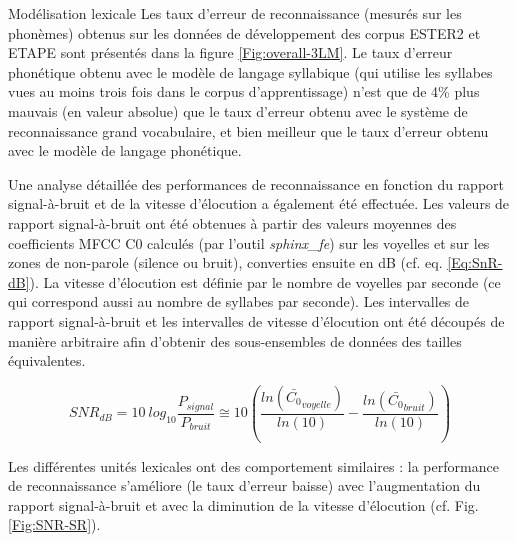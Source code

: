 \documentclass{style/these}
\begin{document}
\begin{part}{Modélisation lexicale}
Les taux d'erreur de reconnaissance (mesurés sur les phonèmes) obtenus sur les données de développement des corpus ESTER2 et ETAPE sont présentés dans la figure \ref{Fig:overall-3LM}. 
Le taux d'erreur phonétique obtenu avec le modèle de langage syllabique (qui utilise les syllabes vues au moins trois fois dans le corpus d'apprentissage) n'est que de 4\% plus mauvais (en valeur absolue) que le taux d'erreur obtenu avec le système de reconnaissance grand vocabulaire, et bien meilleur que le taux d'erreur obtenu avec le modèle de langage phonétique.

Une analyse détaillée des performances de reconnaissance en fonction du rapport signal-à-bruit et de la vitesse d'élocution a également été effectuée. 
Les valeurs de rapport signal-à-bruit ont été obtenues à partir des valeurs moyennes des coefficients MFCC C0 calculés (par l'outil \textit{sphinx\_fe}) sur les voyelles et sur les zones de non-parole (silence ou bruit), converties ensuite en dB (cf. eq. \ref{Eq:SnR-dB}). 
La vitesse d'élocution est définie par le nombre de voyelles par seconde (ce qui correspond aussi au nombre de syllabes par seconde).
Les intervalles de rapport signal-à-bruit et les intervalles de vitesse d'élocution ont été découpés de manière arbitraire afin d'obtenir des sous-ensembles de données des tailles équivalentes.

\begin{equation}
SNR_{dB}=10\ log_{10}\frac{P_{signal}}{P_{bruit}} \cong 10 \left ( \frac{ln(\bar{C_0}_{voyelle})}{ln(10)} - \frac{ln(\bar{C_0}_{bruit})}{ln(10)} \right )
\label{Eq:SnR-dB}
\end{equation}


Les différentes unités lexicales ont des comportement similaires : la performance de reconnaissance s'améliore (le taux d'erreur baisse) avec l'augmentation du rapport signal-à-bruit et avec la diminution de la vitesse d'élocution (cf. Fig. \ref{Fig:SNR-SR}). 


\end{part}
\end{document}
